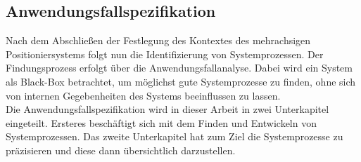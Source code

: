 \documentclass[../Bachelorarbeit.tex]{subfiles}
\begin{document}
\subsection{Anwendungsfallspezifikation} \label{AnwfallSpez}
Nach dem Abschließen der Festlegung des Kontextes des mehrachsigen Positioniersystems folgt nun die Identifizierung von Systemprozessen. Der Findungsprozess erfolgt über die Anwendungsfallanalyse. Dabei wird ein System als Black-Box betrachtet, um möglichst gute Systemprozesse zu finden, ohne sich von internen Gegebenheiten des Systems beeinflussen zu lassen.\\ %
Die Anwendungsfallspezifikation wird in dieser Arbeit in zwei Unterkapitel eingeteilt. Ersteres beschäftigt sich mit dem Finden und Entwickeln von Systemprozessen. Das zweite Unterkapitel hat zum Ziel die Systemprozesse zu präzisieren und diese dann übersichtlich darzustellen.\\
\end{document}
